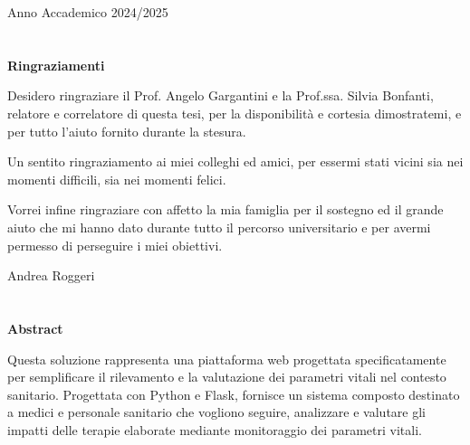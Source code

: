 \documentclass[12pt,a4paper,oneside]{report}
\begin{document}
\begin{titlepage}
    \vfill

    \begin{center}
        {\fontsize{12}{14}\selectfont Anno Accademico 2024/2025}
    \end{center}
\end{titlepage}

\chapter*{}
\thispagestyle{empty}

\begin{center}
    \textbf{Ringraziamenti}
\end{center}

\vspace{0.5cm}

Desidero ringraziare il Prof. Angelo Gargantini e la Prof.ssa. Silvia Bonfanti, relatore e correlatore di questa tesi, per la disponibilità e cortesia dimostratemi, e per tutto l'aiuto fornito durante la stesura.

Un sentito ringraziamento ai miei colleghi ed amici, per essermi stati vicini sia nei momenti difficili, sia nei momenti felici.

Vorrei infine ringraziare con affetto la mia famiglia per il sostegno ed il grande aiuto che mi hanno dato durante tutto il percorso universitario e per avermi permesso di perseguire i miei obiettivi.

\vfill
\begin{flushright}
    Andrea Roggeri
\end{flushright}

\newpage

\chapter*{}
\thispagestyle{empty}

\begin{center}
    \textbf{Abstract}
\end{center}

\vspace{0.5cm}

Questa soluzione rappresenta una piattaforma web progettata specificatamente per semplificare il rilevamento e la valutazione dei parametri vitali nel contesto sanitario. Progettata con Python e Flask, fornisce un sistema composto destinato a medici e personale sanitario che vogliono seguire, analizzare e valutare gli impatti delle terapie elaborate mediante monitoraggio dei parametri vitali.
\end{document}
